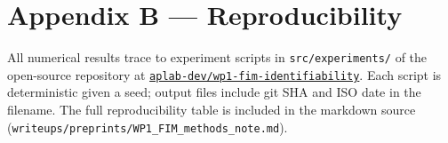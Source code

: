 \documentclass[11pt]{article}
\begin{document}
\section*{Appendix B --- Reproducibility}

All numerical results trace to experiment scripts in
\texttt{src/experiments/} of the open-source repository at
\href{https://github.com/aplab-dev/wp1-fim-identifiability}{\texttt{aplab-dev/wp1-fim-identifiability}}.
Each script is deterministic given a seed; output files include git SHA and ISO
date in the filename. The full reproducibility table is included in the
markdown source (\texttt{writeups/preprints/WP1\_FIM\_methods\_note.md}).
\end{document}
